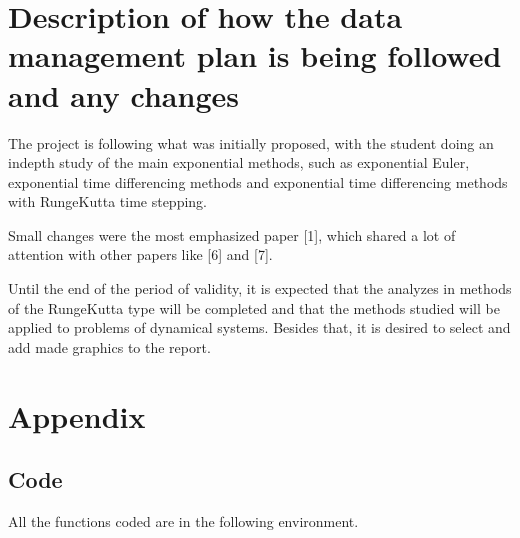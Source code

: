 \documentclass[letterpaper,10pt,english]{jupyterBook}
\begin{document}
\sphinxstepscope


\chapter{Description of how the data management plan is being followed and any changes}
\label{\detokenize{gestao_dados:description-of-how-the-data-management-plan-is-being-followed-and-any-changes}}\label{\detokenize{gestao_dados::doc}}
\sphinxAtStartPar
The project is following what was initially proposed, with the student doing an in\sphinxhyphen{}depth study of the main exponential methods, such as exponential Euler, exponential time differencing methods and exponential time differencing methods with Runge\sphinxhyphen{}Kutta time stepping.

\sphinxAtStartPar
Small changes were the most emphasized paper {[}1{]}, which shared a lot of attention with other papers like {[}6{]} and {[}7{]}.

\sphinxAtStartPar
Until the end of the period of validity, it is expected that the analyzes in methods of the Runge\sphinxhyphen{}Kutta type will be completed and that the methods studied will be applied to problems of dynamical systems. Besides that, it is desired to select and add made graphics to the report.

\sphinxstepscope


\chapter{Appendix}
\label{\detokenize{appendix:appendix}}\label{\detokenize{appendix::doc}}

\section{Code}
\label{\detokenize{appendix:code}}
\sphinxAtStartPar
All the functions coded are in the following environment.
\end{document}
